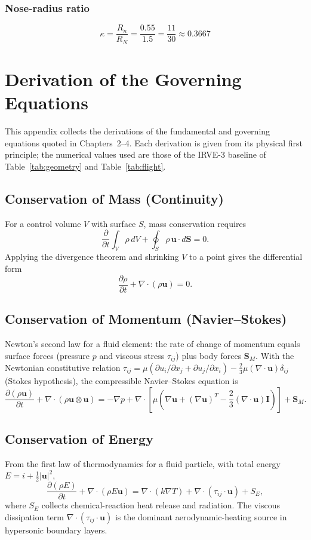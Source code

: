 \subsection{Nose-radius ratio}
\begin{equation}
    \kappa = \frac{R_n}{R_N} = \frac{0.55}{1.5} = \frac{11}{30} \approx 0.3667
\end{equation}

\chapter{Derivation of the Governing Equations}
\label{app:governing_derivations}

This appendix collects the derivations of the fundamental and governing equations
quoted in Chapters~2--4. Each derivation is given from its physical first
principle; the numerical values used are those of the IRVE-3 baseline of
Table~\ref{tab:geometry} and Table~\ref{tab:flight}.

\section{Conservation of Mass (Continuity)}
For a control volume $V$ with surface $S$, mass conservation requires
\[
\frac{\partial}{\partial t}\int_V \rho\,dV + \oint_S \rho\,\mathbf{u}\cdot d\mathbf{S}=0.
\]
Applying the divergence theorem and shrinking $V$ to a point gives the differential
form
\[
\frac{\partial\rho}{\partial t}+\nabla\cdot(\rho\mathbf u)=0.
\]

\section{Conservation of Momentum (Navier--Stokes)}
Newton's second law for a fluid element: the rate of change of momentum equals
surface forces (pressure $p$ and viscous stress $\tau_{ij}$) plus body forces
$\mathbf S_M$. With the Newtonian constitutive relation
$\tau_{ij}=\mu(\partial u_i/\partial x_j+\partial u_j/\partial x_i)
-\frac{2}{3}\mu(\nabla\cdot\mathbf u)\delta_{ij}$ (Stokes hypothesis), the
compressible Navier--Stokes equation is
\[
\frac{\partial(\rho\mathbf u)}{\partial t}+\nabla\cdot(\rho\mathbf u\otimes\mathbf u)
=-\nabla p+\nabla\cdot\left[\mu\left(\nabla\mathbf u+(\nabla\mathbf u)^T
-\frac{2}{3}(\nabla\cdot\mathbf u)\mathbf I\right)\right]+\mathbf S_M.
\]

\section{Conservation of Energy}
From the first law of thermodynamics for a fluid particle, with total energy
$E=i+\tfrac12|\mathbf u|^2$,
\[
\frac{\partial(\rho E)}{\partial t}+\nabla\cdot(\rho E\mathbf u)
=\nabla\cdot(k\nabla T)+\nabla\cdot(\tau_{ij}\cdot\mathbf u)+S_E,
\]
where $S_E$ collects chemical-reaction heat release and radiation. The viscous
dissipation term $\nabla\cdot(\tau_{ij}\cdot\mathbf u)$ is the dominant
aerodynamic-heating source in hypersonic boundary layers.

